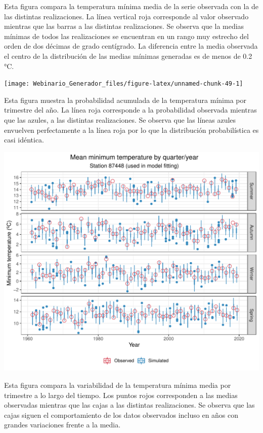 \documentclass[
]{article}
\begin{document}
Esta figura compara la temperatura mínima media de la serie observada con la de las distintas realizaciones. La línea vertical roja corresponde al valor observado mientras que las barras a las distintas realizaciones. Se observa que la medias mínimas de todos las realizaciones se encuentran en un rango muy estrecho del orden de dos décimas de grado centígrado. La diferencia entre la media observada el centro de la distribución de las medias mínimas generadas es de menos de 0.2 °C.

\begin{center}\texttt{[image: Webinario\_Generador\_files/figure-latex/unnamed-chunk-49-1]} \end{center}

Esta figura muestra la probabilidad acumulada de la temperatura mínima por trimestre del año. La línea roja corresponde a la probabilidad observada mientras que las azules, a las distintas realizaciones. Se observa que las líneas azules envuelven perfectamente a la línea roja por lo que la distribución probabilística es casi idéntica.

\begin{center}\includegraphics{Webinario_Generador_files/figure-latex/unnamed-chunk-50-1} \end{center}

Esta figura compara la variabilidad de la temperatura mínima media por trimestre a lo largo del tiempo. Los puntos rojos corresponden a las medias observadas mientras que las cajas a las distintas realizaciones. Se observa que las cajas siguen el comportamiento de los datos observados incluso en años con grandes variaciones frente a la media.
\end{document}
